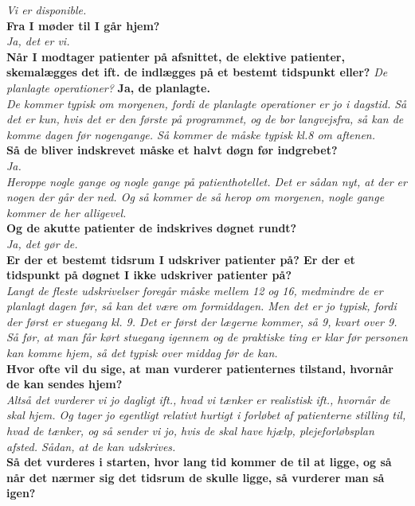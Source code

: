 \noindent
\textit{Vi er disponible.} \\
\noindent
\textbf{Fra I møder til I går hjem?} \\
\noindent
\textit{Ja, det er vi.}  \\
\noindent
\textbf{Når I modtager patienter på afsnittet, de elektive patienter, skemalægges det ift. de indlægges på et bestemt tidspunkt eller?}
\noindent
\textit{De planlagte operationer?}
\noindent
\textbf{Ja, de planlagte.} \\
\noindent
\textit{De kommer typisk om morgenen, fordi de planlagte operationer er jo i dagstid. Så det er kun, hvis det er den første på programmet, og de bor langvejsfra, så kan de komme dagen før nogengange. Så kommer de måske typisk kl.8 om aftenen.} \\
\noindent
\textbf{Så de bliver indskrevet måske et halvt døgn før indgrebet?} \\
\noindent
\textit{Ja.} \\
\noindent
\textit{Heroppe nogle gange og nogle gange på patienthotellet. Det er sådan nyt, at der er nogen der går der ned. Og så kommer de så herop om morgenen, nogle gange kommer de her alligevel.} \\
\noindent
\textbf{Og de akutte patienter de indskrives døgnet rundt?} \\
\noindent
\textit{Ja, det gør de.} \\
\noindent
\textbf{Er der et bestemt tidsrum I udskriver patienter på? Er der et tidspunkt på døgnet I ikke udskriver patienter på?} \\
\noindent
\textit{Langt de fleste udskrivelser foregår måske mellem 12 og 16, medmindre de er planlagt dagen før, så kan det være om formiddagen. Men det er jo typisk, fordi der først er stuegang kl. 9. Det er først der lægerne kommer, så 9, kvart over 9. Så før, at man får kørt stuegang igennem og de praktiske ting er klar før personen kan komme hjem, så det typisk over middag før de kan.} \\
\noindent
\textbf{Hvor ofte vil du sige, at man vurderer patienternes tilstand, hvornår de kan sendes hjem?}  \\
\noindent
\textit{Altså det vurderer vi jo dagligt ift., hvad vi tænker er realistisk ift., hvornår de skal hjem. Og tager jo egentligt relativt hurtigt i forløbet af patienterne stilling til, hvad de tænker, og så sender vi jo, hvis de skal have hjælp, plejeforløbsplan afsted. Sådan, at de kan udskrives.} \\
\noindent
\textbf{Så det vurderes i starten, hvor lang tid kommer de til at ligge, og så når det nærmer sig det tidsrum de skulle ligge, så vurderer man så igen?} \\

